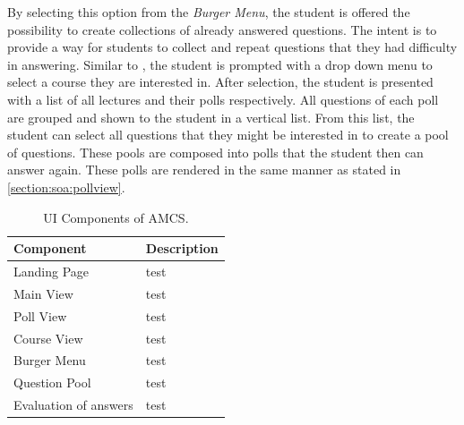 By selecting this option from the \emph{Burger Menu}, the student is offered the possibility to create collections of already answered questions. The intent is to provide a way for students to collect and repeat questions that they had difficulty in answering.
Similar to \todosct, the student is prompted with a drop down menu to select a course they are interested in. After selection, the student is presented with a list of all lectures and their polls respectively. All questions of each poll are grouped and shown to the student in a vertical list. From this list, the student can select all questions that they might be interested in to create a pool of questions.
These pools are composed into polls that the student then can answer again. These polls are rendered in the same manner as stated in \ref{section:soa:pollview}.

\begin{table}[t]
	{\renewcommand{\arraystretch}{2}
		\begin{tabular}{ | p{3cm} | p{12cm} |}
			\hline
			Component & Description \\ \hline \hline
			Landing Page & test \\ \hline
		    Main View & test \\ \hline
			Poll View & test \\ \hline
			Course View & test \\ \hline
			Burger Menu & test \\ \hline
			Question Pool & test \\ \hline
			Evaluation of answers & test \\ \hline
		\end{tabular}
	}
	\caption{UI Components of AMCS.}
	\label{tab:components}
\end{table}

